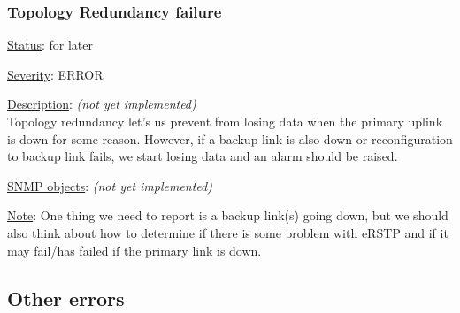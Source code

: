 \subsubsection{\bf Topology Redundancy failure}
		\begin{packed_enum}
			\item [] \underline{Status}: for later
			\item [] \underline{Severity}: ERROR
			\item [] \underline{Description}: \emph{(not yet implemented)}\\
				Topology redundancy let's us prevent from losing data when the primary
				uplink is down for some reason. However, if a backup link is also down
				or reconfiguration to backup link fails, we start losing data and an
				alarm should be raised.
			\item [] \underline{SNMP objects}: \emph{(not yet implemented)}
			\item [] \underline{Note}: One thing we need to report is a backup link(s)
				going down, but we should also think about how to determine if there is
				some problem with eRSTP and if it may fail/has failed if the primary
				link is down.
		\end{packed_enum}

\newpage
\subsection{Other errors}
\label{sec:other_fail}

